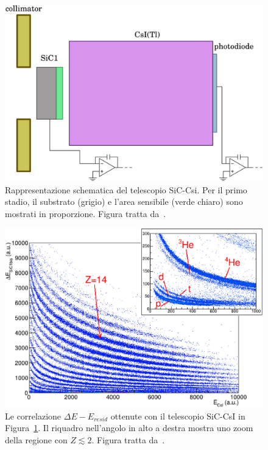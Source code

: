 \begin{figure} [!t]
	\centering
	\includegraphics[scale=0.25]{Grafici/ciampi-telescopio.png}
	\caption{Rappresentazione schematica del telescopio SiC-Csi. Per il primo stadio, il substrato (grigio) e l'area sensibile (verde chiaro) sono mostrati in proporzione. Figura tratta da~\cite{ciampi:nima19}.} \label{fig:ciampi_telescopio}
\end{figure}



\begin{figure} [!p]
	\centering
	\includegraphics[width=\textwidth, keepaspectratio]{Grafici/ciampi-deltaE-E.png}
	\caption{Le correlazione $\Delta E - E_{resid}$ ottenute con il telescopio SiC-CsI in Figura~\ref{fig:ciampi_telescopio}. Il riquadro nell'angolo in alto a destra mostra uno zoom della regione con $Z \lesssim 2$. Figura tratta da~\cite{ciampi:nima19}.} \label{fig:ciampi_deltaE_E}
\end{figure}

